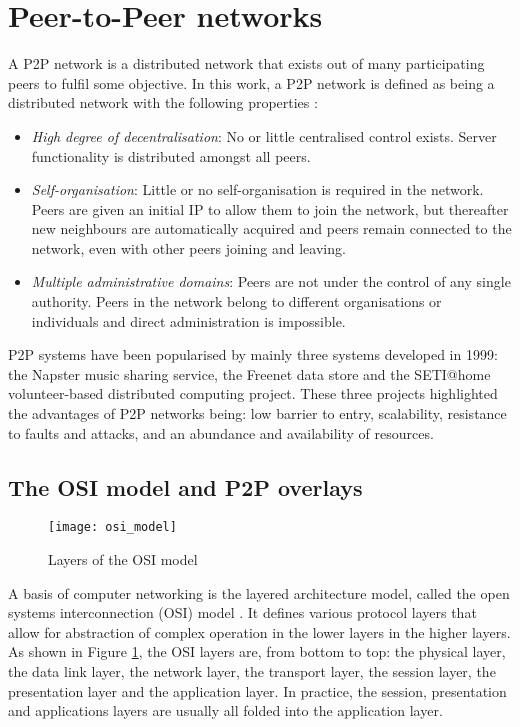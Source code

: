 \section{Peer-to-Peer networks}

A P2P network is a distributed network that exists out of many participating peers to fulfil some objective. In this work, a P2P network is defined as being a distributed network with the following properties
\cite{Rodrigues_acm_comms_p2p}:
%
\begin{itemize}
\item \emph{High degree of decentralisation}:  No or little centralised control exists. Server functionality is distributed amongst all peers.
\item \emph{Self-organisation}: Little or no self-organisation is required in the network. Peers are given an initial IP to allow them to join the network, but thereafter new neighbours are automatically acquired and peers remain connected to the network, even with other peers joining and leaving.
\item \emph{Multiple administrative domains}: Peers are not under the control of any single authority. Peers in the network belong to different organisations or individuals and direct administration is impossible.
\end{itemize}

P2P systems have been popularised by mainly three systems developed in 1999: the Napster music sharing service, the Freenet data store and the SETI@home volunteer-based distributed computing project. These three projects highlighted the advantages of P2P networks being: low barrier to entry, scalability, resistance to faults and attacks, and an abundance and availability of resources.

\subsection{The OSI model and P2P overlays}

\begin{figure}[htbp]
 \centering
 \texttt{[image: osi\_model]}
 \caption{Layers of the OSI model}
 \label{fig_osi_model}
\end{figure}
%
A basis of computer networking is the layered architecture model, called the open systems interconnection (OSI) model \cite{OSI_protocol_stack}. It defines various protocol layers that allow for abstraction of complex operation in the lower layers in the higher layers. As shown in Figure \ref{fig_osi_model}, the OSI layers are, from bottom to top: the physical layer, the data link layer, the network layer, the transport layer, the session layer, the presentation layer and the application layer. In practice, the session, presentation and applications layers are usually all folded into the application layer.

